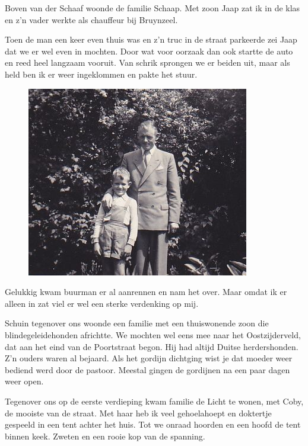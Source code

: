 \documentclass[10pt,twoside, openright]{memoir}
\begin{document}
Boven van der Schaaf woonde de familie Schaap. Met zoon Jaap zat ik in de klas en z’n vader werkte als chauffeur bij Bruynzeel. 

Toen de man een keer even thuis was en z'n truc in de straat parkeerde zei Jaap dat we er wel even in mochten. Door wat voor oorzaak dan ook startte de auto en reed heel langzaam vooruit. Van schrik sprongen we er beiden uit, maar als held ben ik er weer ingeklommen en pakte het stuur. 

\begin{figure}
\includegraphics[width=\textwidth]{img/ch5/indetuin}
\caption*{\footnotesize }
\end{figure}

Gelukkig kwam buurman er al aanrennen en nam het over. Maar omdat ik er alleen in zat viel er wel een sterke verdenking op mij. 

Schuin tegenover ons woonde een familie met een thuiswonende zoon die blindegeleidehonden africhtte. We mochten wel eens mee naar het Oostzijderveld, dat aan het eind van de Poortstraat begon. Hij had altijd Duitse herdershonden. Z'n ouders waren al bejaard. Als het gordijn dichtging wist je dat moeder weer bediend werd door de pastoor. Meestal gingen de gordijnen na een paar dagen weer open. 

Tegenover ons op de eerste verdieping kwam familie de Licht te wonen, met Coby, de mooiste van de straat. Met haar heb ik veel gehoelahoept en doktertje gespeeld in een tent achter het huis. Tot we onraad hoorden en een hoofd de tent binnen keek. Zweten en een rooie kop van de spanning. 
\end{document}
